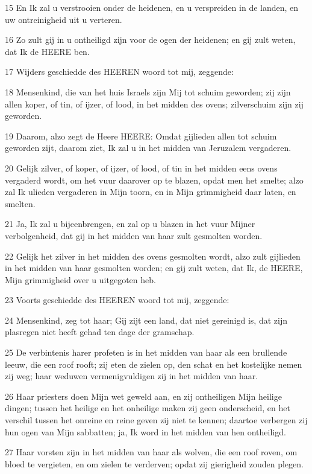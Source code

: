 \par 15 En Ik zal u verstrooien onder de heidenen, en u verspreiden in de landen, en uw ontreinigheid uit u verteren.
\par 16 Zo zult gij in u ontheiligd zijn voor de ogen der heidenen; en gij zult weten, dat Ik de HEERE ben.
\par 17 Wijders geschiedde des HEEREN woord tot mij, zeggende:
\par 18 Mensenkind, die van het huis Israels zijn Mij tot schuim geworden; zij zijn allen koper, of tin, of ijzer, of lood, in het midden des ovens; zilverschuim zijn zij geworden.
\par 19 Daarom, alzo zegt de Heere HEERE: Omdat gijlieden allen tot schuim geworden zijt, daarom ziet, Ik zal u in het midden van Jeruzalem vergaderen.
\par 20 Gelijk zilver, of koper, of ijzer, of lood, of tin in het midden eens ovens vergaderd wordt, om het vuur daarover op te blazen, opdat men het smelte; alzo zal Ik ulieden vergaderen in Mijn toorn, en in Mijn grimmigheid daar laten, en smelten.
\par 21 Ja, Ik zal u bijeenbrengen, en zal op u blazen in het vuur Mijner verbolgenheid, dat gij in het midden van haar zult gesmolten worden.
\par 22 Gelijk het zilver in het midden des ovens gesmolten wordt, alzo zult gijlieden in het midden van haar gesmolten worden; en gij zult weten, dat Ik, de HEERE, Mijn grimmigheid over u uitgegoten heb.
\par 23 Voorts geschiedde des HEEREN woord tot mij, zeggende:
\par 24 Mensenkind, zeg tot haar; Gij zijt een land, dat niet gereinigd is, dat zijn plasregen niet heeft gehad ten dage der gramschap.
\par 25 De verbintenis harer profeten is in het midden van haar als een brullende leeuw, die een roof rooft; zij eten de zielen op, den schat en het kostelijke nemen zij weg; haar weduwen vermenigvuldigen zij in het midden van haar.
\par 26 Haar priesters doen Mijn wet geweld aan, en zij ontheiligen Mijn heilige dingen; tussen het heilige en het onheilige maken zij geen onderscheid, en het verschil tussen het onreine en reine geven zij niet te kennen; daartoe verbergen zij hun ogen van Mijn sabbatten; ja, Ik word in het midden van hen ontheiligd.
\par 27 Haar vorsten zijn in het midden van haar als wolven, die een roof roven, om bloed te vergieten, en om zielen te verderven; opdat zij gierigheid zouden plegen.
